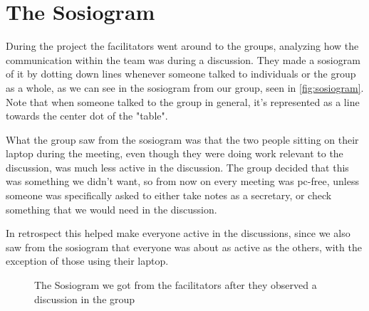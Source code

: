 \section{The Sosiogram}
During the project the facilitators went around to the groups, analyzing how the communication within the team was during a discussion. They made a sosiogram of it by dotting down lines whenever someone talked to individuals or the group as a whole, as we can see in the sosiogram from our group, seen in \autoref{fig:sosiogram}. Note that when someone talked to the group in general, it's represented as a line towards the center dot of the "table".

What the group saw from the sosiogram was that the two people sitting on their laptop during the meeting, even though they were doing work relevant to the discussion, was much less active in the discussion. The group decided that this was something we didn't want, so from now on every meeting was pc-free, unless someone was specifically asked to either take notes as a secretary, or check something that we would need in the discussion.

In retrospect this helped make everyone active in the discussions, since we also saw from the sosiogram that everyone was about as active as the others, with the exception of those using their laptop. 
\newpage{}
\begin{figure}
	\begin{center}
	\end{center}
	\caption[The Sosiogram]{The Sosiogram we got from the facilitators after they observed a discussion in the group}
	\label{fig:sosiogram}
\end{figure}